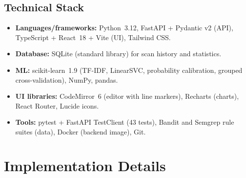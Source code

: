 \documentclass[11pt,a4paper,twoside]{report}
\begin{document}
\subsection{Technical Stack}
\begin{itemize}[noitemsep]
  \item \textbf{Languages/frameworks:} Python~3.12, FastAPI \cite{fastapi} + Pydantic v2 (API), TypeScript + React~18 + Vite (UI), Tailwind CSS.
  \item \textbf{Database:} SQLite (standard library) for scan history and statistics.
  \item \textbf{ML:} scikit-learn~1.9 \cite{sklearn} (TF-IDF, LinearSVC, probability calibration, grouped cross-validation), NumPy, pandas.
  \item \textbf{UI libraries:} CodeMirror~6 (editor with line markers), Recharts (charts), React Router, Lucide icons.
  \item \textbf{Tools:} pytest + FastAPI TestClient (43 tests), Bandit and Semgrep rule suites (data), Docker (backend image), Git.
\end{itemize}

\section{Implementation Details}
\end{document}
